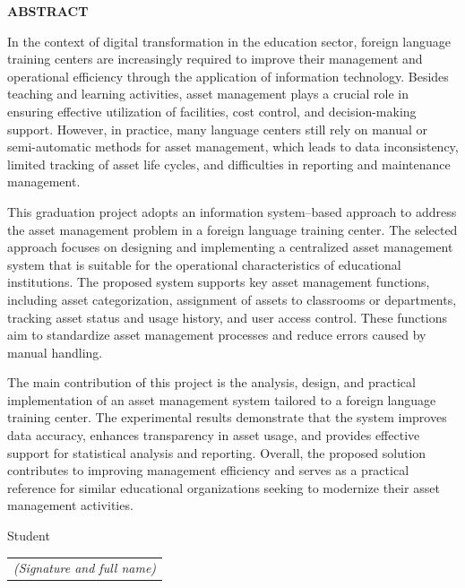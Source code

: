 \documentclass[../DoAn.tex]{subfiles}
\begin{document}
\begin{center}
    \Large{\textbf{ABSTRACT}}\\
\end{center}
\vspace{1cm}

In the context of digital transformation in the education sector, foreign language training centers are increasingly required to improve their management and operational efficiency through the application of information technology. Besides teaching and learning activities, asset management plays a crucial role in ensuring effective utilization of facilities, cost control, and decision-making support. However, in practice, many language centers still rely on manual or semi-automatic methods for asset management, which leads to data inconsistency, limited tracking of asset life cycles, and difficulties in reporting and maintenance management.

This graduation project adopts an information system–based approach to address the asset management problem in a foreign language training center. The selected approach focuses on designing and implementing a centralized asset management system that is suitable for the operational characteristics of educational institutions. The proposed system supports key asset management functions, including asset categorization, assignment of assets to classrooms or departments, tracking asset status and usage history, and user access control. These functions aim to standardize asset management processes and reduce errors caused by manual handling.

The main contribution of this project is the analysis, design, and practical implementation of an asset management system tailored to a foreign language training center. The experimental results demonstrate that the system improves data accuracy, enhances transparency in asset usage, and provides effective support for statistical analysis and reporting. Overall, the proposed solution contributes to improving management efficiency and serves as a practical reference for similar educational organizations seeking to modernize their asset management activities.

\begin{flushright}
Student\\
\begin{tabular}{@{}c@{}}
\textit{(Signature and full name)}
\end{tabular}
\end{flushright}
\end{document}
